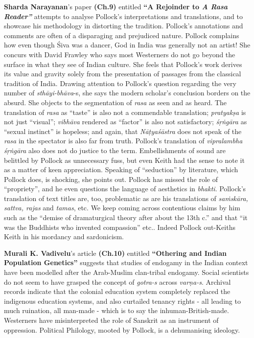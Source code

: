 \textbf{Sharda Narayanan}’s paper \textbf{(Ch.9)} entitled \textbf{“A Rejoinder to \textit{A Rasa Reader”}} attempts to analyse Pollock’s interpretations and translations, and to showcase his methodology in distorting the tradition. Pollock’s annotations and comments are often of a disparaging and prejudiced nature. Pollock complains how even though Śiva was a dancer, God in India was generally not an artist! She concurs with David Frawley who says most Westerners do not go beyond the surface in what they see of Indian culture. She feels that Pollock’s work derives its value and gravity solely from the presentation of passages from the classical tradition of India. Drawing attention to Pollock’s question regarding the very number of \textit{sthāyi-bhāva}-s, she says the modern scholar’s conclusion borders on the absurd. She objects to the segmentation of \textit{rasa} as seen and as heard. The translation of \textit{rasa} as “taste” is also not a commendable translation; \textit{pratyakṣa} is not just “visual”; \textit{vibhāva} rendered as “factor” is also not satisfactory; \textit{śṛṅgāra} as “sexual instinct” is hopeless; and again, that \textit{Nāṭyaśāstra} does not speak of the \textit{rasa} in the spectator is also far from truth. Pollock’s translation of \textit{vipralambha śṛṅgāra} also does not do justice to the term. Embellishments of sound are belittled by Pollock as unnecessary fuss, but even Keith had the sense to note it as a matter of keen appreciation. Speaking of “seduction” by literature, which Pollock does, is shocking, she points out. Pollock has missed the role of “propriety”, and he even questions the language of aesthetics in \textit{bhakti}. Pollock’s translation of text titles are, too, problematic as are his translations of \textit{saṁskāra, sattva, rajas} and \textit{tamas}, etc. We keep coming across contentious claims by him such as the “demise of dramaturgical theory after about the 13th c.” and that “it was the Buddhists who invented compassion” etc.. Indeed Pollock out-Keiths Keith in his mordancy and sardonicism.

\textbf{Murali K. Vadivelu}’s article \textbf{(Ch.10)} entitled \textbf{“Othering and Indian Population Genetics”} suggests that studies of endogamy in the Indian context have been modelled after the Arab-Muslim clan-tribal endogamy. Social scientists do not seem to have grasped the concept of \textit{gotra-s} across \textit{varṇa-s}. Archival records indicate that the colonial education system completely replaced the indigenous education systems, and also curtailed tenancy rights - all leading to much ruination, all man-made - which is to say the inhuman-British-made. Westerners have misinterpreted the role of Sanskrit as an instrument of oppression. Political Philology, mooted by Pollock, is a dehumanising ideology.

